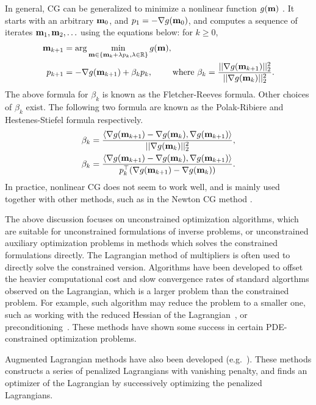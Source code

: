 In general, CG can be generalized to minimize a nonlinear function $g({\bf m})$ 
\cite{fletcher2013practical,dai2011nonlinear}.
It starts with an arbitrary ${\bf m}_0$, and $p_1 = - \mathbf{\nabla} g({\bf m}_0)$, and computes
a sequence of iterates ${\bf m}_1, {\bf m}_2, \ldots$ using the equations below:
for $k \ge 0$,
\begin{align}
	{\bf m}_{k+1} 
		&= \arg\min_{{\bf m} \in \{{\bf m}_k + \lambda p_k, \lambda \in \mathbb{R}\}} g({\bf m}), \\
	p_{k+1}
		&= -\mathbf{\nabla} g({\bf m}_{k+1}) + \beta_{k} p_k, 
		\qquad\text{ where }
		\beta_k = \frac{||\mathbf{\nabla} g({\bf m}_{k+1})||_2^2}{||\mathbf{\nabla} g({\bf m}_{k})||_2^2}.
\end{align}
The above formula for $\beta_k$ is known as the Fletcher-Reeves formula.
Other choices of $\beta_k$ exist.
The following two formula are known as the Polak-Ribiere and Hestenes-Stiefel
formula respectively.
\begin{align}
    \beta_{k}
		&= \frac{\langle \mathbf{\nabla} g({\bf m}_{k+1}) - \mathbf{\nabla} g({\bf m}_{k}),  \mathbf{\nabla} g({\bf m}_{k+1}) \rangle}
        {||\mathbf{\nabla} g({\bf m}_{k})||_2^2}, \\
    \beta_{k}
		&= \frac{\langle \mathbf{\nabla} g({\bf m}_{k+1}) - \mathbf{\nabla} g({\bf m}_{k}),  \mathbf{\nabla} g({\bf m}_{k+1}) \rangle}
        {p_{k}^{\top} (\mathbf{\nabla} g({\bf m}_{k+1}) - \mathbf{\nabla} g({\bf m}_{k}))}.
\end{align}
In practice, nonlinear CG does not seem to work well, and is mainly used
together with other methods, such as in the Newton CG method
\cite{nocedal2006numerical}.

\medskip{}
The above discussion focuses on unconstrained optimization algorithms, which are
suitable for unconstrained formulations of inverse problems, or unconstrained
auxiliary optimization problems in methods which solves the constrained
formulations directly.
The Lagrangian method of multipliers is often used to directly solve the
constrained version.
Algorithms have been developed to offset the heavier computational cost and
slow convergence rates of standard algorthms observed on the Lagrangian, which
is a larger problem than the constrained problem.
For example, such algorithm may reduce the problem to a smaller one, such as
working with the reduced Hessian of the Lagrangian~\cite{haber2000optimization},
or preconditioning~\cite{haber2001preconditioned,benzi2011preconditioning}.
These methods have shown some success in certain PDE-constrained optimization
problems.

Augmented Lagrangian methods have also been developed
(e.g.~\cite{ito1990augmented,abdoulaev2005optical}).
These methods constructs a series of penalized Lagrangians with vanishing
penalty, and finds an optimizer of the Lagrangian by successively optimizing the
penalized Lagrangians.


